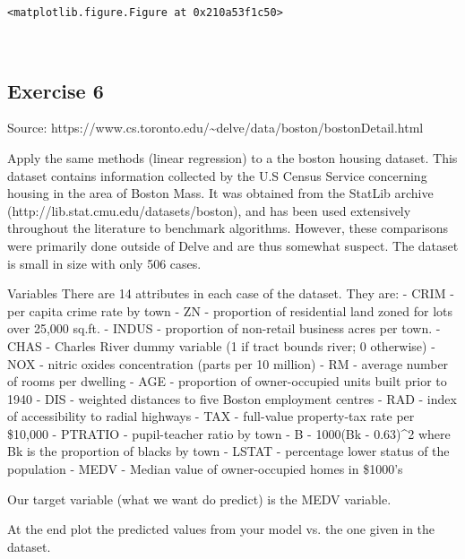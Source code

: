 \documentclass[11pt]{article}
\begin{document}
    
    \begin{verbatim}
<matplotlib.figure.Figure at 0x210a53f1c50>
    \end{verbatim}

    
    \begin{center}
    \end{center}
    { \hspace*{\fill} \\}
    
    \subsection{Exercise 6}\label{exercise-6}

    Source:
https://www.cs.toronto.edu/\textasciitilde{}delve/data/boston/bostonDetail.html

    Apply the same methods (linear regression) to a the boston housing
dataset. This dataset contains information collected by the U.S Census
Service concerning housing in the area of Boston Mass. It was obtained
from the StatLib archive (http://lib.stat.cmu.edu/datasets/boston), and
has been used extensively throughout the literature to benchmark
algorithms. However, these comparisons were primarily done outside of
Delve and are thus somewhat suspect. The dataset is small in size with
only 506 cases.

Variables There are 14 attributes in each case of the dataset. They are:
- CRIM - per capita crime rate by town - ZN - proportion of residential
land zoned for lots over 25,000 sq.ft. - INDUS - proportion of
non-retail business acres per town. - CHAS - Charles River dummy
variable (1 if tract bounds river; 0 otherwise) - NOX - nitric oxides
concentration (parts per 10 million) - RM - average number of rooms per
dwelling - AGE - proportion of owner-occupied units built prior to 1940
- DIS - weighted distances to five Boston employment centres - RAD -
index of accessibility to radial highways - TAX - full-value
property-tax rate per \$10,000 - PTRATIO - pupil-teacher ratio by town -
B - 1000(Bk - 0.63)\^{}2 where Bk is the proportion of blacks by town -
LSTAT - percentage lower status of the population - MEDV - Median value
of owner-occupied homes in \$1000's

Our target variable (what we want do predict) is the MEDV variable.

At the end plot the predicted values from your model vs. the one given
in the dataset.
\end{document}
